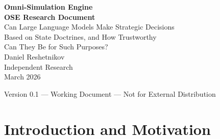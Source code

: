\documentclass[12pt, a4paper]{article}
\begin{document}

\begin{titlepage}
\centering
\vspace*{3cm}

{\Huge\bfseries Omni-Simulation Engine}\\[0.5cm]
{\Large\bfseries OSE Research Document}\\[1cm]
{\large Can Large Language Models Make Strategic Decisions\\
Based on State Doctrines, and How Trustworthy\\
Can They Be for Such Purposes?}\\[2cm]

{\large Daniel Reshetnikov}\\[0.3cm]
{\normalsize Independent Research}\\[0.3cm]
{\normalsize March 2026}\\[3cm]

\begin{abstract}
\noindent This document describes the Omni-Simulation Engine (OSE): a modular, LLM-driven geopolitical conflict simulation designed to investigate whether large language models can make strategic decisions consistent with prescribed state decision doctrines, and how trustworthy that behavior is across varying crisis conditions. OSE operationalizes actors as doctrine-constrained decision-makers rather than persona-based roleplayers, introduces a formal perception filter grounded in Jervis's misperception thesis, and produces measurable doctrine fidelity and behavioral consistency scores across repeated scenario runs. The first test environment is a contemporary Taiwan Strait crisis scenario with four actors: the United States, the People's Republic of China, Taiwan, and Japan. This document situates OSE within existing literature, defines the research question, describes the theoretical framework, and outlines the experimental design and expected contributions to IR theory, LLM capability evaluation, and AI governance policy.
\end{abstract}

\vfill
{\small Version 0.1 --- Working Document --- Not for External Distribution}
\end{titlepage}

\newpage
\tableofcontents
\newpage

\section{Introduction and Motivation}
\end{document}
